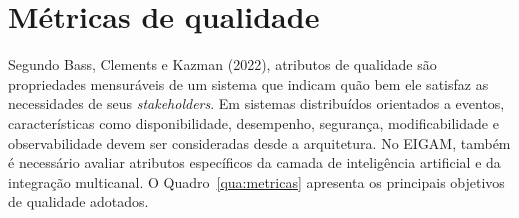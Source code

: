\section{Métricas de qualidade}

Segundo Bass, Clements e Kazman (2022), atributos de qualidade são propriedades mensuráveis de um sistema que indicam quão bem ele satisfaz as necessidades de seus \textit{stakeholders}. Em sistemas distribuídos orientados a eventos, características como disponibilidade, desempenho, segurança, modificabilidade e observabilidade devem ser consideradas desde a arquitetura. No EIGAM, também é necessário avaliar atributos específicos da camada de inteligência artificial e da integração multicanal. O Quadro~\ref{qua:metricas} apresenta os principais objetivos de qualidade adotados.

